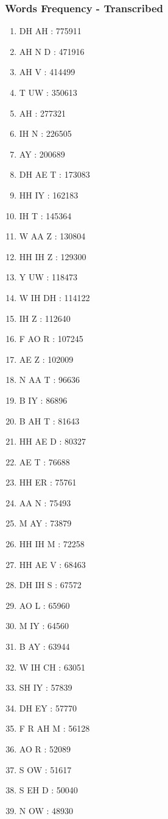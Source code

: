\documentclass{beamer}
\begin{document}
\frame
{
  \frametitle{Words Frequency - Transcribed}
\begin{tiny}
\begin{multicols}{4}
\begin{enumerate}
    \item DH AH : 775911
	\item AH N D : 471916
	\item AH V : 414499
	\item T UW : 350613
	\item AH : 277321
	\item IH N : 226505
	\item AY : 200689
	\item DH AE T : 173083
	\item HH IY : 162183
	\item IH T : 145364
	\item W AA Z : 130804
	\item HH IH Z : 129300
	\item Y UW : 118473
	\item W IH DH : 114122
	\item IH Z : 112640
	\item F AO R : 107245
	\item AE Z : 102009
	\item N AA T : 96636
	\item B IY : 86896
	\item B AH T : 81643
	\item HH AE D : 80327
	\item AE T : 76688
	\item HH ER : 75761
	\item AA N : 75493
	\item M AY : 73879
	\item HH IH M : 72258
	\item HH AE V : 68463
	\item DH IH S : 67572
	\item AO L : 65960
	\item M IY : 64560
	\item B AY : 63944
	\item W IH CH : 63051
	\item SH IY : 57839
	\item DH EY : 57770
	\item F R AH M : 56128
	\item AO R : 52089
	\item S OW : 51617
	\item S EH D : 50040
	\item N OW : 48930

\end{enumerate}
\end{multicols}
\end{tiny}}
\end{document}
